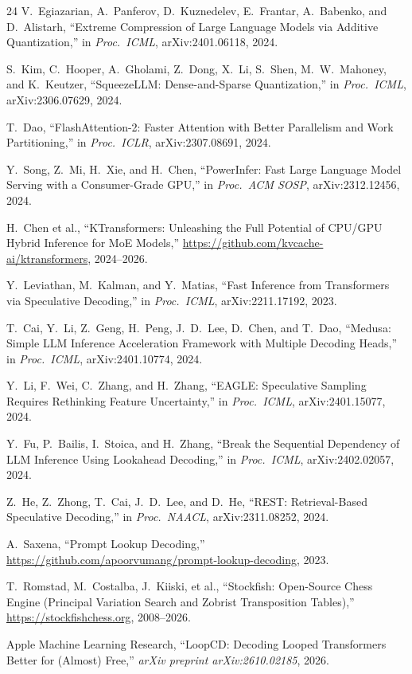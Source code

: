 \documentclass[10pt,twocolumn]{article}
\begin{document}
{\begin{thebibliography}{24}
V.~Egiazarian, A.~Panferov, D.~Kuznedelev, E.~Frantar, A.~Babenko, and D.~Alistarh, ``Extreme Compression of Large Language Models via Additive Quantization,'' in \emph{Proc.\ ICML}, arXiv:2401.06118, 2024.

S.~Kim, C.~Hooper, A.~Gholami, Z.~Dong, X.~Li, S.~Shen, M.~W.~Mahoney, and K.~Keutzer, ``SqueezeLLM: Dense-and-Sparse Quantization,'' in \emph{Proc.\ ICML}, arXiv:2306.07629, 2024.

T.~Dao, ``FlashAttention-2: Faster Attention with Better Parallelism and Work Partitioning,'' in \emph{Proc.\ ICLR}, arXiv:2307.08691, 2024.

Y.~Song, Z.~Mi, H.~Xie, and H.~Chen, ``PowerInfer: Fast Large Language Model Serving with a Consumer-Grade GPU,'' in \emph{Proc.\ ACM SOSP}, arXiv:2312.12456, 2024.

H.~Chen et al., ``KTransformers: Unleashing the Full Potential of CPU/GPU Hybrid Inference for MoE Models,'' \url{https://github.com/kvcache-ai/ktransformers}, 2024--2026.

Y.~Leviathan, M.~Kalman, and Y.~Matias, ``Fast Inference from Transformers via Speculative Decoding,'' in \emph{Proc.\ ICML}, arXiv:2211.17192, 2023.

T.~Cai, Y.~Li, Z.~Geng, H.~Peng, J.~D.~Lee, D.~Chen, and T.~Dao, ``Medusa: Simple LLM Inference Acceleration Framework with Multiple Decoding Heads,'' in \emph{Proc.\ ICML}, arXiv:2401.10774, 2024.

Y.~Li, F.~Wei, C.~Zhang, and H.~Zhang, ``EAGLE: Speculative Sampling Requires Rethinking Feature Uncertainty,'' in \emph{Proc.\ ICML}, arXiv:2401.15077, 2024.

Y.~Fu, P.~Bailis, I.~Stoica, and H.~Zhang, ``Break the Sequential Dependency of LLM Inference Using Lookahead Decoding,'' in \emph{Proc.\ ICML}, arXiv:2402.02057, 2024.

Z.~He, Z.~Zhong, T.~Cai, J.~D.~Lee, and D.~He, ``REST: Retrieval-Based Speculative Decoding,'' in \emph{Proc.\ NAACL}, arXiv:2311.08252, 2024.

A.~Saxena, ``Prompt Lookup Decoding,'' \url{https://github.com/apoorvumang/prompt-lookup-decoding}, 2023.

T.~Romstad, M.~Costalba, J.~Kiiski, et al., ``Stockfish: Open-Source Chess Engine (Principal Variation Search and Zobrist Transposition Tables),'' \mbox{\url{https://stockfishchess.org}}, 2008--2026.

Apple Machine Learning Research, ``LoopCD: Decoding Looped Transformers Better for (Almost) Free,'' \emph{arXiv preprint arXiv:2610.02185}, 2026.

\end{thebibliography}
}
\end{document}
